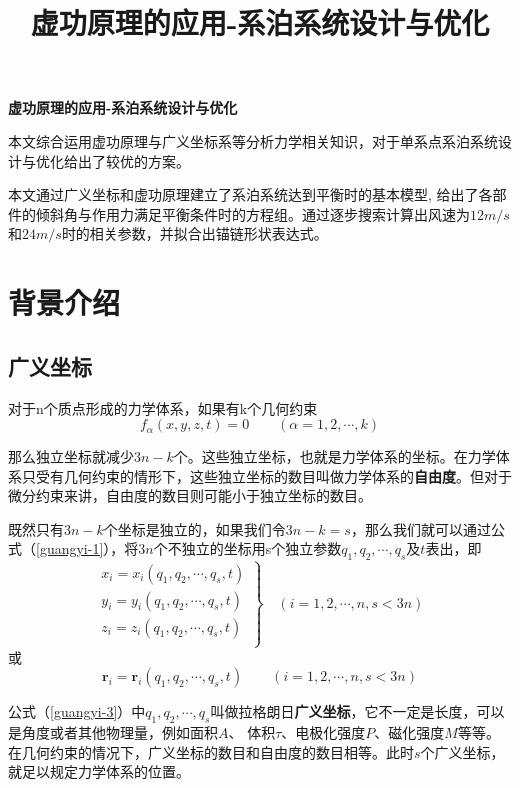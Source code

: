 \documentclass[withoutpreface,bwprint]{cumcmthesis} %
\title{虚功原理的应用-系泊系统设计与优化}
\begin{document}
\centerline{\textbf{ 虚功原理的应用-系泊系统设计与优化}}

\abs{}

\par 本文综合运用虚功原理与广义坐标系等分析力学相关知识，对于单系点系泊系统设计与优化给出了较优的方案。

\par 本文通过广义坐标和虚功原理建立了系泊系统达到平衡时的基本模型, 给出了各部件的倾斜角与作用力满足平衡条件时的方程组。通过逐步搜索计算出风速为$12m/s$和$24m/s$时的相关参数，并拟合出锚链形状表达式。


\section{背景介绍}

\subsection{广义坐标}
\par 对于n个质点形成的力学体系，如果有k个几何约束
\begin{equation}
	\label{guangyi-1}
	f_\alpha (x,y,z,t) = 0 \qquad (\alpha = 1,2,\cdots,k)
\end{equation}
\par 那么独立坐标就减少$3n-k$个。这些独立坐标，也就是力学体系的坐标。在力学体系只受有几何约束的情形下，这些独立坐标的数目叫做力学体系的\textbf{自由度}。但对于微分约束来讲，自由度的数目则可能小于独立坐标的数目。
\par 既然只有$3n-k$个坐标是独立的，如果我们令$3n-k=s$，那么我们就可以通过公式（\ref{guangyi-1}），将$3n$个不独立的坐标用s个独立参数$q_1,q_2,\cdots,q_s$及$t$表出，即
\begin{equation}
	\label{guangyi-2}
\left. 
  	\begin{array}{lr}  
  	x_i = x_i (q_1,q_2,\cdots,q_s,t)\\
  	y_i = y_i (q_1,q_2,\cdots,q_s,t)\\
  	z_i = z_i (q_1,q_2,\cdots,q_s,t)\\   
	\end{array}  
\right\} \quad (i = 1,2,\cdots,n,s<3n)  
\end{equation}
或
\begin{equation}
	\label{guangyi-3}
	\textbf{r}_i = \textbf{r}_i (q_1,q_2,\cdots,q_s,t) \qquad (i = 1,2,\cdots,n,s<3n)
\end{equation}
\par 公式（\ref{guangyi-3}）中$q_1,q_2,\cdots,q_s$叫做拉格朗日\textbf{广义坐标}，它不一定是长度，可以是角度或者其他物理量，例如面积$A$、 体积$\tau$、电极化强度$P$、磁化强度$M$等等。在几何约束的情况下，广义坐标的数目和自由度的数目相等。此时$s$个广义坐标，就足以规定力学体系的位置。
\end{document}
